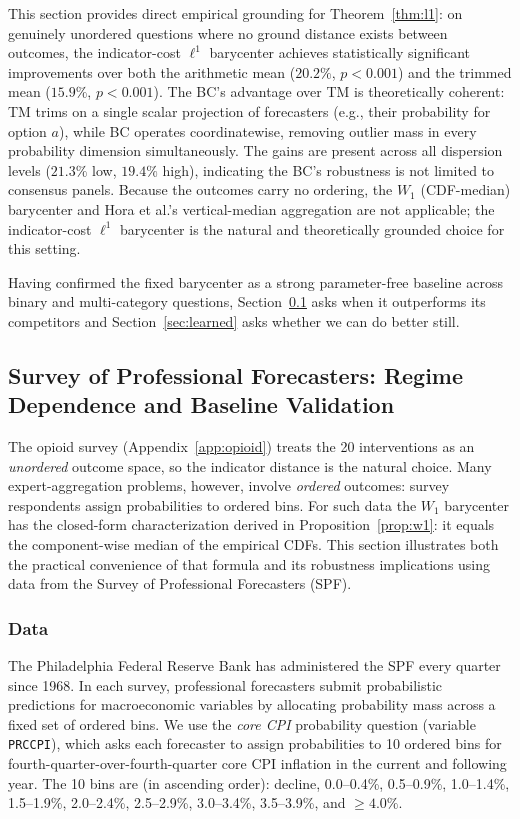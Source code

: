 This section provides direct empirical grounding for Theorem~\ref{thm:l1}: on genuinely unordered questions where no ground distance exists between outcomes, the indicator-cost $\ell^1$ barycenter achieves statistically significant improvements over both the arithmetic mean ($20.2\%$, $p < 0.001$) and the trimmed mean ($15.9\%$, $p < 0.001$).  The BC's advantage over TM is theoretically coherent: TM trims on a single scalar projection of forecasters (e.g., their probability for option $a$), while BC operates coordinatewise, removing outlier mass in every probability dimension simultaneously.  The gains are present across all dispersion levels ($21.3\%$ low, $19.4\%$ high), indicating the BC's robustness is not limited to consensus panels.  Because the outcomes carry no ordering, the $W_1$ (CDF-median) barycenter and Hora et al.'s vertical-median aggregation are not applicable; the indicator-cost $\ell^1$ barycenter is the natural and theoretically grounded choice for this setting.

Having confirmed the fixed barycenter as a strong parameter-free baseline across binary and multi-category questions, Section~\ref{sec:spf} asks when it outperforms its competitors and Section~\ref{sec:learned} asks whether we can do better still.

\subsection{Survey of Professional Forecasters: Regime Dependence and Baseline Validation}
\label{sec:spf}

The opioid survey (Appendix~\ref{app:opioid}) treats the 20 interventions as an \emph{unordered} outcome space, so the indicator distance is the natural choice.  Many expert-aggregation problems, however, involve \emph{ordered} outcomes: survey respondents assign probabilities to ordered bins.  For such data the $W_1$ barycenter has the closed-form characterization derived in Proposition~\ref{prop:w1}: it equals the component-wise median of the empirical CDFs.  This section illustrates both the practical convenience of that formula and its robustness implications using data from the Survey of Professional Forecasters (SPF).

\subsubsection{Data}

The Philadelphia Federal Reserve Bank has administered the SPF every quarter since 1968.  In each survey, professional forecasters submit probabilistic predictions for macroeconomic variables by allocating probability mass across a fixed set of ordered bins.  We use the \emph{core CPI} probability question (variable \texttt{PRCCPI}), which asks each forecaster to assign probabilities to 10 ordered bins for fourth-quarter-over-fourth-quarter core CPI inflation in the current and following year.  The 10 bins are (in ascending order): decline, 0.0--0.4\%, 0.5--0.9\%, 1.0--1.4\%, 1.5--1.9\%, 2.0--2.4\%, 2.5--2.9\%, 3.0--3.4\%, 3.5--3.9\%, and $\geq 4.0\%$.

